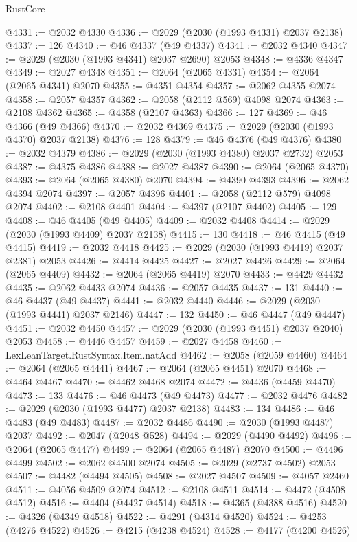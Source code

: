 \begin{lexlean}{RustCore}
\begin{coremodule}
@4331 := @2032 @4330
@4336 := @2029 (@2030 (@1993 @4331) @2037 @2138)
@4337 := 126
@4340 := @46 @4337 (@49 @4337)
@4341 := @2032 @4340
@4347 := @2029 (@2030 (@1993 @4341) @2037 @2690) @2053
@4348 := @4336 @4347
@4349 := @2027 @4348
@4351 := @2064 (@2065 @4331)
@4354 := @2064 (@2065 @4341) @2070
@4355 := @4351 @4354
@4357 := @2062 @4355 @2074
@4358 := @2057 @4357
@4362 := @2058 (@2112 @569) @4098 @2074
@4363 := @2108 @4362
@4365 := @4358 (@2107 @4363)
@4366 := 127
@4369 := @46 @4366 (@49 @4366)
@4370 := @2032 @4369
@4375 := @2029 (@2030 (@1993 @4370) @2037 @2138)
@4376 := 128
@4379 := @46 @4376 (@49 @4376)
@4380 := @2032 @4379
@4386 := @2029 (@2030 (@1993 @4380) @2037 @2732) @2053
@4387 := @4375 @4386
@4388 := @2027 @4387
@4390 := @2064 (@2065 @4370)
@4393 := @2064 (@2065 @4380) @2070
@4394 := @4390 @4393
@4396 := @2062 @4394 @2074
@4397 := @2057 @4396
@4401 := @2058 (@2112 @579) @4098 @2074
@4402 := @2108 @4401
@4404 := @4397 (@2107 @4402)
@4405 := 129
@4408 := @46 @4405 (@49 @4405)
@4409 := @2032 @4408
@4414 := @2029 (@2030 (@1993 @4409) @2037 @2138)
@4415 := 130
@4418 := @46 @4415 (@49 @4415)
@4419 := @2032 @4418
@4425 := @2029 (@2030 (@1993 @4419) @2037 @2381) @2053
@4426 := @4414 @4425
@4427 := @2027 @4426
@4429 := @2064 (@2065 @4409)
@4432 := @2064 (@2065 @4419) @2070
@4433 := @4429 @4432
@4435 := @2062 @4433 @2074
@4436 := @2057 @4435
@4437 := 131
@4440 := @46 @4437 (@49 @4437)
@4441 := @2032 @4440
@4446 := @2029 (@2030 (@1993 @4441) @2037 @2146)
@4447 := 132
@4450 := @46 @4447 (@49 @4447)
@4451 := @2032 @4450
@4457 := @2029 (@2030 (@1993 @4451) @2037 @2040) @2053
@4458 := @4446 @4457
@4459 := @2027 @4458
@4460 := LexLeanTarget.RustSyntax.Item.natAdd
@4462 := @2058 (@2059 @4460)
@4464 := @2064 (@2065 @4441)
@4467 := @2064 (@2065 @4451) @2070
@4468 := @4464 @4467
@4470 := @4462 @4468 @2074
@4472 := @4436 (@4459 @4470)
@4473 := 133
@4476 := @46 @4473 (@49 @4473)
@4477 := @2032 @4476
@4482 := @2029 (@2030 (@1993 @4477) @2037 @2138)
@4483 := 134
@4486 := @46 @4483 (@49 @4483)
@4487 := @2032 @4486
@4490 := @2030 (@1993 @4487) @2037
@4492 := @2047 (@2048 @528)
@4494 := @2029 (@4490 @4492)
@4496 := @2064 (@2065 @4477)
@4499 := @2064 (@2065 @4487) @2070
@4500 := @4496 @4499
@4502 := @2062 @4500 @2074
@4505 := @2029 (@2737 @4502) @2053
@4507 := @4482 (@4494 @4505)
@4508 := @2027 @4507
@4509 := @4057 @2460
@4511 := @4056 @4509 @2074
@4512 := @2108 @4511
@4514 := @4472 (@4508 @4512)
@4516 := @4404 (@4427 @4514)
@4518 := @4365 (@4388 @4516)
@4520 := @4326 (@4349 @4518)
@4522 := @4291 (@4314 @4520)
@4524 := @4253 (@4276 @4522)
@4526 := @4215 (@4238 @4524)
@4528 := @4177 (@4200 @4526)

\end{coremodule}
\end{lexlean}
